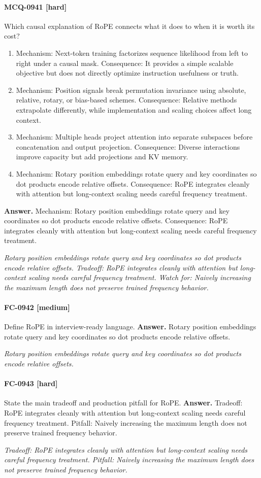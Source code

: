 \paragraph{MCQ-0941 [hard]} Which causal explanation of RoPE connects what it does to when it is worth its cost?
\begin{enumerate}[label=\Alph*.]
\item Mechanism: Next-token training factorizes sequence likelihood from left to right under a causal mask. Consequence: It provides a simple scalable objective but does not directly optimize instruction usefulness or truth.
\item Mechanism: Position signals break permutation invariance using absolute, relative, rotary, or bias-based schemes. Consequence: Relative methods extrapolate differently, while implementation and scaling choices affect long context.
\item Mechanism: Multiple heads project attention into separate subspaces before concatenation and output projection. Consequence: Diverse interactions improve capacity but add projections and KV memory.
\item Mechanism: Rotary position embeddings rotate query and key coordinates so dot products encode relative offsets. Consequence: RoPE integrates cleanly with attention but long-context scaling needs careful frequency treatment.
\end{enumerate}
\noindent\textbf{Answer.} Mechanism: Rotary position embeddings rotate query and key coordinates so dot products encode relative offsets. Consequence: RoPE integrates cleanly with attention but long-context scaling needs careful frequency treatment.
\par\textit{Rotary position embeddings rotate query and key coordinates so dot products encode relative offsets. Tradeoff: RoPE integrates cleanly with attention but long-context scaling needs careful frequency treatment. Watch for: Naively increasing the maximum length does not preserve trained frequency behavior.}
\paragraph{FC-0942 [medium]} Define RoPE in interview-ready language.
\noindent\textbf{Answer.} Rotary position embeddings rotate query and key coordinates so dot products encode relative offsets.
\par\textit{Rotary position embeddings rotate query and key coordinates so dot products encode relative offsets.}
\paragraph{FC-0943 [hard]} State the main tradeoff and production pitfall for RoPE.
\noindent\textbf{Answer.} Tradeoff: RoPE integrates cleanly with attention but long-context scaling needs careful frequency treatment. Pitfall: Naively increasing the maximum length does not preserve trained frequency behavior.
\par\textit{Tradeoff: RoPE integrates cleanly with attention but long-context scaling needs careful frequency treatment. Pitfall: Naively increasing the maximum length does not preserve trained frequency behavior.}
